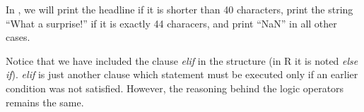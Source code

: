 In , we will print the headline if it is shorter than 40 characters, print the string ``What a surprise!'' if it is exactly 44 characers, and print ``NaN'' in all other cases. 


Notice that we have included the clause \emph{elif} in the structure (in R it is noted \emph{else if}). \emph{elif} is just another clause which statement must be executed only if an earlier condition was not satisfied. However, the reasoning behind the logic operators remains the same.
